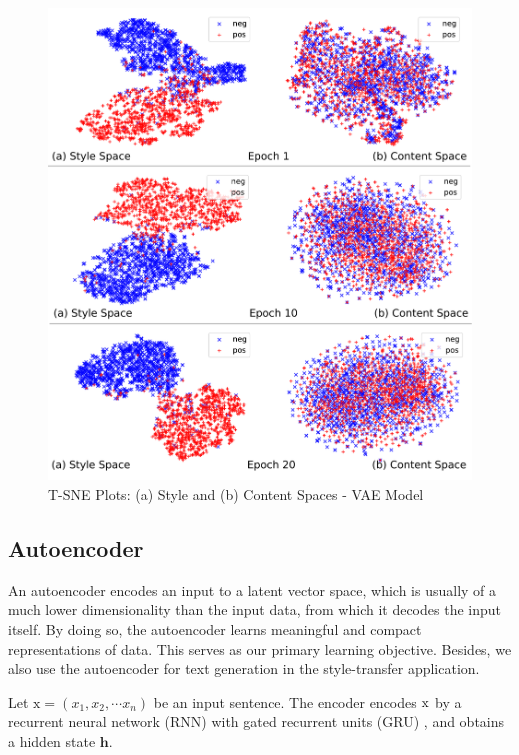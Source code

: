 \documentclass[11pt,a4paper]{article}
\newcommand{\rmx}{\mathrm x}
\begin{document}
\begin{figure}[ht]
	\captionsetup{justification=centering}
	\includegraphics[width=\linewidth]{latent-spaces-vae}
	\caption{T-SNE Plots: (a) Style and (b) Content Spaces - VAE Model}
	\label{fig:vae-tsne}
\end{figure}


\subsection{Autoencoder} \label{ssec:seq2seq-autoencoder}

An autoencoder encodes an input to a latent vector space, which is usually of a much lower dimensionality than the input data, from which it decodes the input itself. By doing so, the autoencoder learns meaningful and compact representations of data. This serves as our primary learning objective. Besides, we also use the autoencoder for text generation in the style-transfer application.

Let $\rmx=(x_1, x_2, \cdots x_n)$ be an input sentence. The encoder encodes $\rm x$ by a recurrent neural network (RNN) with gated recurrent units (GRU) \cite{cho2014learning}, and obtains a hidden state $\bm h$.
\end{document}
